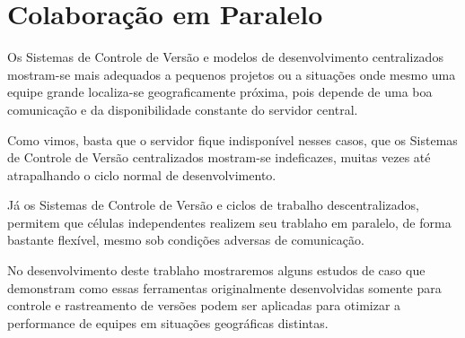 \section{Colaboração em Paralelo}

Os Sistemas de Controle de Versão e modelos de desenvolvimento centralizados mostram-se mais adequados a pequenos projetos ou a situações onde mesmo uma equipe grande localiza-se geograficamente próxima, pois depende de uma boa comunicação e da disponibilidade constante do servidor central.

Como vimos, basta que o servidor fique indisponível nesses casos, que os Sistemas de Controle de Versão centralizados mostram-se indeficazes, muitas vezes até atrapalhando o ciclo normal de desenvolvimento.

Já os Sistemas de Controle de Versão e ciclos de trabalho descentralizados, permitem que células independentes realizem seu trablaho em paralelo, de forma bastante flexível, mesmo sob condições adversas de comunicação.

No desenvolvimento deste trablaho mostraremos alguns estudos de caso que demonstram como essas ferramentas originalmente desenvolvidas somente para controle e rastreamento de versões podem ser aplicadas para otimizar a performance de equipes em situações geográficas distintas.